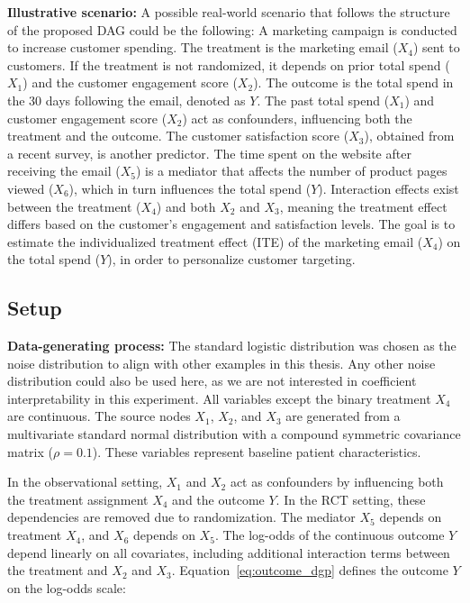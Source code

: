 \medskip

\textbf{Illustrative scenario:} A possible real-world scenario that follows the structure of the proposed DAG could be the following: A marketing campaign is conducted to increase customer spending. The treatment is the marketing email ($X_4$) sent to customers. If the treatment is not randomized, it depends on prior total spend ($X_1$) and the customer engagement score ($X_2$). The outcome is the total spend in the 30 days following the email, denoted as $Y$. The past total spend ($X_1$) and customer engagement score ($X_2$) act as confounders, influencing both the treatment and the outcome. The customer satisfaction score ($X_3$), obtained from a recent survey, is another predictor. The time spent on the website after receiving the email ($X_5$) is a mediator that affects the number of product pages viewed ($X_6$), which in turn influences the total spend ($Y$). Interaction effects exist between the treatment ($X_4$) and both $X_2$ and $X_3$, meaning the treatment effect differs based on the customer's engagement and satisfaction levels. The goal is to estimate the individualized treatment effect (ITE) of the marketing email ($X_4$) on the total spend ($Y$), in order to personalize customer targeting.

\medskip

\subsection{Setup} \label{sec:methods_experiment4}

\textbf{Data-generating process:} The standard logistic distribution was chosen as the noise distribution to align with other examples in this thesis. Any other noise distribution could also be used here, as we are not interested in coefficient interpretability in this experiment. All variables except the binary treatment $X_4$ are continuous. The source nodes $X_1$, $X_2$, and $X_3$ are generated from a multivariate standard normal distribution with a compound symmetric covariance matrix ($\rho = 0.1$). These variables represent baseline patient characteristics.

In the observational setting, $X_1$ and $X_2$ act as confounders by influencing both the treatment assignment $X_4$ and the outcome $Y$. In the RCT setting, these dependencies are removed due to randomization. The mediator $X_5$ depends on treatment $X_4$, and $X_6$ depends on $X_5$. The log-odds of the continuous outcome $Y$ depend linearly on all covariates, including additional interaction terms between the treatment and $X_2$ and $X_3$. Equation~\ref{eq:outcome_dgp} defines the outcome $Y$ on the log-odds scale:

